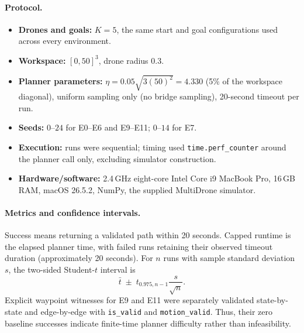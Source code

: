 \documentclass[11pt,a4paper]{article}
\begin{document}
\paragraph{Protocol.}
\begin{itemize}[nosep]
  \item \textbf{Drones and goals:} $K=5$, the same start and goal
        configurations used across every environment.
  \item \textbf{Workspace:} $[0,50]^3$, drone radius $0.3$.
  \item \textbf{Planner parameters:} $\eta=0.05\sqrt{3(50)^2}=4.330$
        (5\% of the workspace diagonal), uniform sampling only (no bridge
        sampling), 20-second timeout per run.
  \item \textbf{Seeds:} $0$--$24$ for E0--E6 and E9--E11;
        $0$--$14$ for E7.
  \item \textbf{Execution:} runs were sequential; timing used
        \texttt{time.perf\_counter} around the planner call only, excluding
        simulator construction.
  \item \textbf{Hardware/software:} 2.4\,GHz eight-core Intel Core i9
        MacBook Pro, 16\,GB RAM, macOS 26.5.2, NumPy, the supplied
        MultiDrone simulator.
\end{itemize}

\paragraph{Metrics and confidence intervals.}
Success means returning a validated path within 20 seconds. Capped runtime is
the elapsed planner time, with failed runs retaining their observed timeout
duration (approximately 20 seconds). For $n$ runs with sample standard
deviation $s$, the two-sided Student-$t$ interval is
\[
  \bar t \;\pm\; t_{0.975,n-1}\frac{s}{\sqrt n}.
\]
Explicit waypoint witnesses for E9 and E11 were separately validated
state-by-state and edge-by-edge with \texttt{is\_valid} and
\texttt{motion\_valid}. Thus, their zero baseline successes indicate
finite-time planner difficulty rather than infeasibility.
\end{document}
